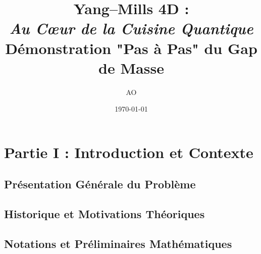 \documentclass[12pt,a4paper]{book}
\title{%
	Yang--Mills 4D : \\
	\textit{Au Cœur de la Cuisine Quantique} \\
	\large Démonstration "Pas à Pas" du Gap de Masse
}
\author{AO}
\date{\today}
\theoremstyle{remark}
\theoremstyle{definition}
\theoremstyle{plain}
\begin{document}
	
	\frontmatter
	
	
	\mainmatter
	
	\part*{Partie I : Introduction et Contexte}
	
	\chapter{Présentation Générale du Problème}
	\label{chap:1}
	
	
	\chapter{Historique et Motivations Théoriques}
	\label{chap:2}
	
	
	\chapter{Notations et Préliminaires Mathématiques}
	\label{chap:3}
	
	
\end{document}
